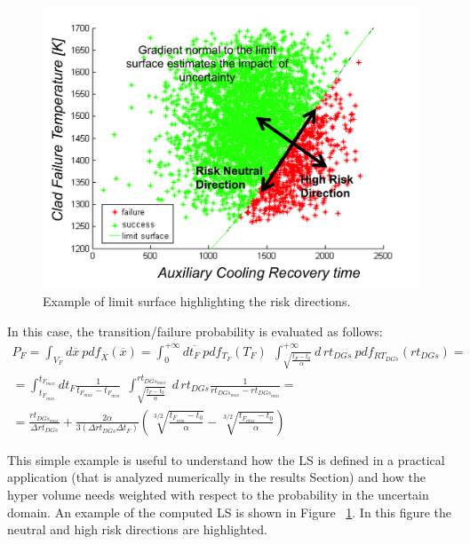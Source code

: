 \begin{figure}[h!]
  \centering
  \includegraphics[width=1.0\textwidth]  {pics/ExampleLSwitRiskDirections.png}
  \caption{Example of limit surface highlighting the risk directions.}
  \label{fig:ExampleLSwitRiskDirections}
\end{figure}
In this case, the transition/failure probability is evaluated as follows:
\begin{equation}
\begin{matrix}
P_{F} = \int_{V_{F}}d\overline{x}\: pdf_{\overline{X}}\left ( \overline{x} \right )
= \int_{0}^{+\infty }d\overline{t_{F}}\: pdf_{T_{F}}\left ( T_{F} \right )\: \: \int_{\sqrt{\frac{t_{F}-t_{0}}{\alpha}}}^{+\infty } d\, rt_{DGs} \: pdf_{RT_{DGs}}\left ( rt_{DGs} \right )  =
\\
= \int_{t_{F_{min}}}^{t_{F_{max}}} dt_{F}\frac{1}{t_{F_{max}}-t_{F_{min}}}\: \: \int_{\sqrt{\frac{t_{F}-t_{0}}{\alpha}}}^{ rt_{DGs_{max}}}\: d\, rt_{DGs} \frac{1}{rt_{DGs_{max}}-rt_{DGs_{min}}} =
\\
= \frac{rt_{DGs_{max}}}{\Delta rt_{DGs}} + \frac{2\alpha}{3\left ( \Delta rt_{DGs}\Delta t_{F} \right )}
\left ( \sqrt[3/2]{\frac{t_{F_{min}}-t_{0}}{\alpha}} - \sqrt[3/2]{\frac{t_{F_{max}}-t_{0}}{\alpha}} \right )
\end{matrix}
\end{equation}

This simple example is useful to understand how the LS is defined in a practical application (that is analyzed numerically in the results Section) and how the hyper volume needs weighted with respect to the probability in the uncertain domain. An example of the computed LS is shown in Figure ~\ref{fig:ExampleLSwitRiskDirections}.
In this figure the neutral and high risk directions are highlighted.


